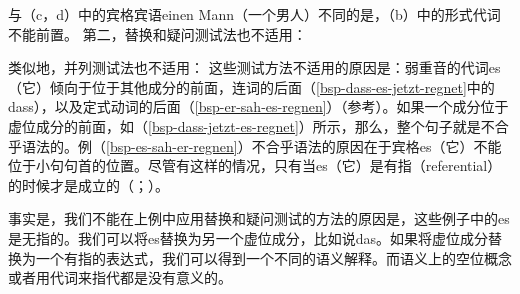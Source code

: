 \zl
与（c，d）中的宾格宾语einen Mann（一个男人）不同的是，（b）中的形式代词不能前置。
第二，替换和疑问测试法也不适用：
\eal
{}
\zl

\noindent
类似地，并列测试法也不适用：
\z
这些测试方法不适用的原因是：弱重音的代词es（它）倾向于位于其他成分的前面，连词的后面（\ref{bsp-dass-es-jetzt-regnet}中的dass），以及定式动词的后面（\ref{bsp-er-sah-es-regnen}）（参考\citealp[]{Abraham95a-u}）。如果一个成分位于虚位成分的前面，如（\ref{bsp-dass-jetzt-es-regnet}）所示，那么，整个句子就是不合乎语法的。例（\ref{bsp-es-sah-er-regnen}）不合乎语法的原因在于宾格es（它）不能位于小句句首的位置。尽管有这样的情况，只有当es（它）是有指（referential）的时候才是成立的（\citealt[]{Lenerz94a}；\citealp[]{GS97a}）。

事实是，我们不能在上例中应用替换和疑问测试的方法的原因是，这些例子中的es是无指的。我们可以将es替换为另一个虚位成分，比如说das。如果将虚位成分替换为一个有指的表达式，我们可以得到一个不同的语义解释。而语义上的空位概念或者用代词来指代都是没有意义的。

